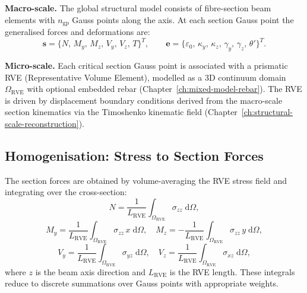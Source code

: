 \textbf{Macro-scale.}
The global structural model consists of fibre-section beam elements
with $n_{\text{gp}}$ Gauss points along the axis.  At each section
Gauss point the generalised forces and deformations are:
\begin{equation}
  \label{eq:fe2-gen}
  \mathbf{s} = \{N, \, M_y, \, M_z, \, V_y, \, V_z, \, T\}^T, \qquad
  \mathbf{e} = \{\varepsilon_0, \, \kappa_y, \, \kappa_z,
                 \, \gamma_y, \, \gamma_z, \, \theta'\}^T.
\end{equation}

\textbf{Micro-scale.}
Each critical section Gauss point is associated with a prismatic RVE
(Representative Volume Element), modelled as a 3D continuum domain
$\Omega_{\text{RVE}}$ with optional embedded rebar
(Chapter~\ref{ch:mixed-model-rebar}).  The RVE is driven by
displacement boundary conditions derived from the macro-scale section
kinematics via the Timoshenko kinematic field
(Chapter~\ref{ch:structural-scale-reconstruction}).

\subsection{Homogenisation: Stress to Section Forces}

The section forces are obtained by volume-averaging the RVE stress
field and integrating over the cross-section:
\begin{equation}
  \label{eq:fe2-homog-N}
  N = \frac{1}{L_{\text{RVE}}} \int_{\Omega_{\text{RVE}}}
      \sigma_{zz} \; \mathrm{d}\Omega,
\end{equation}
\begin{equation}
  \label{eq:fe2-homog-M}
  M_y = \frac{1}{L_{\text{RVE}}} \int_{\Omega_{\text{RVE}}}
        \sigma_{zz} \, x \; \mathrm{d}\Omega, \quad
  M_z = -\frac{1}{L_{\text{RVE}}} \int_{\Omega_{\text{RVE}}}
        \sigma_{zz} \, y \; \mathrm{d}\Omega,
\end{equation}
\begin{equation}
  \label{eq:fe2-homog-V}
  V_y = \frac{1}{L_{\text{RVE}}} \int_{\Omega_{\text{RVE}}}
        \sigma_{yz} \; \mathrm{d}\Omega, \quad
  V_z = \frac{1}{L_{\text{RVE}}} \int_{\Omega_{\text{RVE}}}
        \sigma_{xz} \; \mathrm{d}\Omega,
\end{equation}
where $z$ is the beam axis direction and $L_{\text{RVE}}$ is the RVE
length.  These integrals reduce to discrete summations over Gauss
points with appropriate weights.

